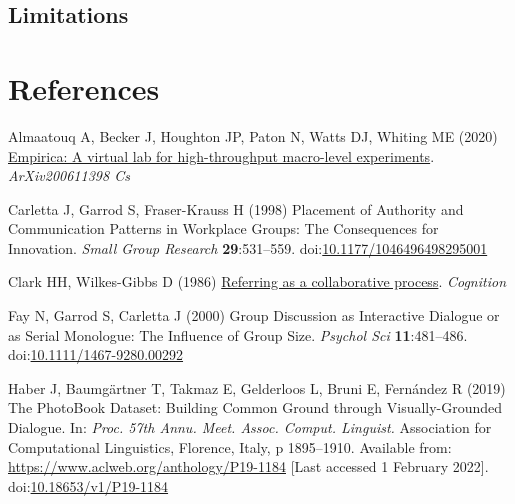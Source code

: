 \documentclass[
  english,
  a4paper,
]{article}
\newlength{\cslhangindent}
\newlength{\cslentryspacingunit} %
\newenvironment{CSLReferences}[2] %
 {%
  \setlength{\parindent}{0pt}
  \ifodd #1
  \let\oldpar\par
  \def\par{\hangindent=\cslhangindent\oldpar}
  \fi
  \setlength{\parskip}{#2\cslentryspacingunit}
 }%
 {}
\begin{document}
\hypertarget{limitations}{%
\subsection{Limitations}\label{limitations}}

\hypertarget{references}{%
\section{References}\label{references}}

\setlength{\parindent}{-0.1in} 
\setlength{\leftskip}{0.125in}

\noindent

\hypertarget{refs}{}
\begin{CSLReferences}{1}{0}
\leavevmode{}%
Almaatouq A, Becker J, Houghton JP, Paton N, Watts DJ, Whiting ME (2020) \href{http://arxiv.org/abs/2006.11398}{Empirica: A virtual lab for high-throughput macro-level experiments}. \emph{ArXiv200611398 Cs}

\leavevmode{}%
Carletta J, Garrod S, Fraser-Krauss H (1998) Placement of {Authority} and {Communication Patterns} in {Workplace Groups}: {The Consequences} for {Innovation}. \emph{Small Group Research} \textbf{29}:531--559. doi:\href{https://doi.org/10.1177/1046496498295001}{10.1177/1046496498295001}

\leavevmode{}%
Clark HH, Wilkes-Gibbs D (1986) \href{http://www.speech.kth.se/~edlund/bielefeld/references/clark-and-wilkes-gibbs-1986.pdf}{Referring as a collaborative process}. \emph{Cognition}

\leavevmode{}%
Fay N, Garrod S, Carletta J (2000) Group {Discussion} as {Interactive Dialogue} or as {Serial Monologue}: {The Influence} of {Group Size}. \emph{Psychol Sci} \textbf{11}:481--486. doi:\href{https://doi.org/10.1111/1467-9280.00292}{10.1111/1467-9280.00292}

\leavevmode{}%
Haber J, Baumgärtner T, Takmaz E, Gelderloos L, Bruni E, Fernández R (2019) The {PhotoBook Dataset}: {Building Common Ground} through {Visually-Grounded Dialogue}. In: \emph{Proc. 57th {Annu}. {Meet}. {Assoc}. {Comput}. {Linguist}.} {Association for Computational Linguistics}, {Florence, Italy}, p 1895--1910. Available from: \url{https://www.aclweb.org/anthology/P19-1184} {[}Last accessed 1 February 2022{]}. doi:\href{https://doi.org/10.18653/v1/P19-1184}{10.18653/v1/P19-1184}


\end{CSLReferences}
\end{document}
